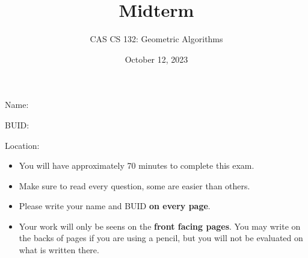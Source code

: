 \documentclass{article}
\title{
  Midterm
}
\author{CAS CS 132: Geometric Algorithms}
\date{October 12, 2023}
\theoremstyle{remark}
\begin{document}
\maketitle

\noindent Name:

\bigskip

\noindent BUID:

\bigskip

\noindent Location:

\bigskip

\begin{itemize}
\item You will have approximately 70 minutes to complete this exam.
\item Make sure to read every question, some are easier than others.
\item Please write your name and BUID \textbf{on every page}.
\item Your work will only be seens on the \textbf{front facing pages}.
  You may write on the backs of pages if you are using a pencil, but you will not be evaluated on what is written there.
\end{itemize}

\pagebreak
\end{document}
